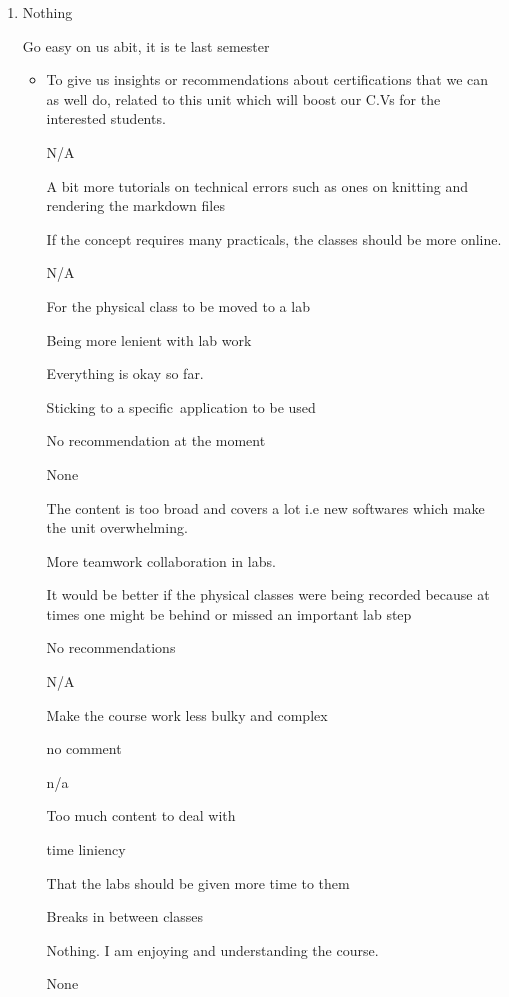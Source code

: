 \documentclass[
]{article}
\providecommand{\tightlist}{%
  \setlength{\itemsep}{0pt}\setlength{\parskip}{0pt}}
\begin{document}
\begin{enumerate}
\def\labelenumi{\arabic{enumi}.}
\tightlist
\item
  Nothing

  Go easy on us abit, it is te last semester

  \begin{itemize}
  \tightlist
  \item
    To give us insights or recommendations about certifications that we
    can as well do, related to this unit which will boost our C.Vs for
    the interested students.~

    N/A

    A bit more tutorials on technical errors such as ones on knitting
    and rendering the markdown files

    If the concept requires many practicals, the classes should be more
    online.

    N/A

    For the physical class to be moved to a lab

    Being more lenient with lab work

    Everything is okay so far.

    Sticking to a specific~application to be used

    No recommendation at the moment

    None

    The content is too broad and covers a lot i.e new softwares which
    make the unit overwhelming.

    More teamwork collaboration in labs.

    It would be better if the physical classes were being recorded
    because at times one might be behind or missed an important lab step
    ~

    No recommendations

    N/A

    Make the course work less bulky and complex

    no comment

    n/a

    Too much content to deal with

    time liniency

    That the labs should be given more time to them~

    Breaks in between classes

    Nothing. I am enjoying and understanding the course.

    None~


\end{itemize}
\end{enumerate}
\end{document}
